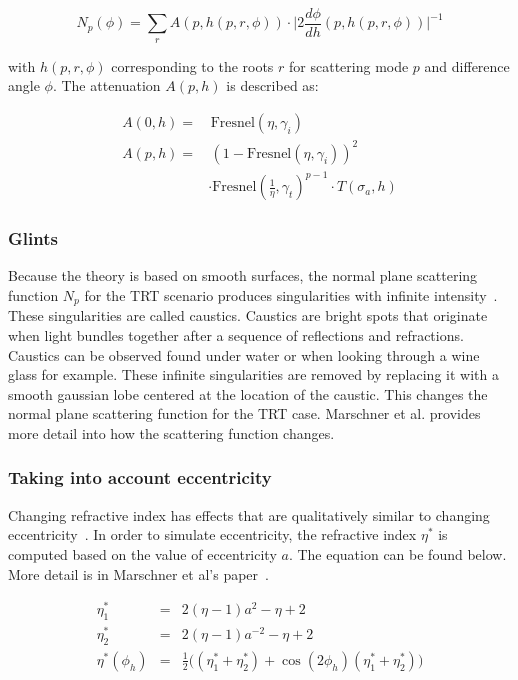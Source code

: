 \documentclass[11pt,a4paper]{report}
\begin{document}
\begin{equation}
N_p(\phi) = \sum\limits_r A(p, h(p, r, \phi)) \cdot \Big \vert 2 \frac{d\phi}{dh}( p, h(p, r, \phi) ) \Big \vert^{-1}
\label{azimuthal_marschner}
\end{equation}

with $h(p, r, \phi)$ corresponding to the roots $r$ for scattering mode $p$ and difference angle $\phi$. The attenuation $A(p, h)$ is described as:

\begin{align}
A(0, h) = &\, \textrm{Fresnel}( \eta, \gamma_i ) \\
A(p, h) = &\, (1 - \textrm{Fresnel}( \eta, \gamma_i ))^2 \nonumber \\
 & \cdot \textrm{Fresnel}( \frac{1}{\eta}, \gamma_t )^ {p-1} \cdot T(\sigma_a, h)
\end{align}

\subsubsection{Glints}

Because the theory is based on smooth surfaces, the normal plane scattering function $N_p$ for the TRT scenario produces singularities with infinite intensity~\cite{marschner}. These singularities are called caustics. Caustics are bright spots that originate when light bundles together after a sequence of reflections and refractions. Caustics can be observed found under water or when looking  through a wine glass for example. These infinite singularities are removed by replacing it with a smooth gaussian lobe centered at the location of the caustic. This changes the normal plane scattering function for the TRT case. Marschner et al.\cite{marschner} provides more detail into how the scattering function changes.

\subsubsection{Taking into account eccentricity}

Changing refractive index has effects that are qualitatively similar to changing eccentricity~\cite{marschner}. In order to simulate eccentricity, the refractive index $\eta^*$ is computed based on the value of eccentricity $a$. The equation can be found below. More detail is in Marschner et al's paper~\cite{marschner}.

\begin{eqnarray}
\eta_1^* & = & 2(\eta - 1) a^2 - \eta + 2 \\
\eta_2^* & = & 2(\eta - 1) a^{-2} - \eta + 2 \\
\eta^*(\phi_h) & = & \frac{1}{2}\big((\eta_1^* + \eta_2^*)+\cos(2\phi_h)(\eta_1^* + \eta_2^*) \big)
\end{eqnarray}
\end{document}
